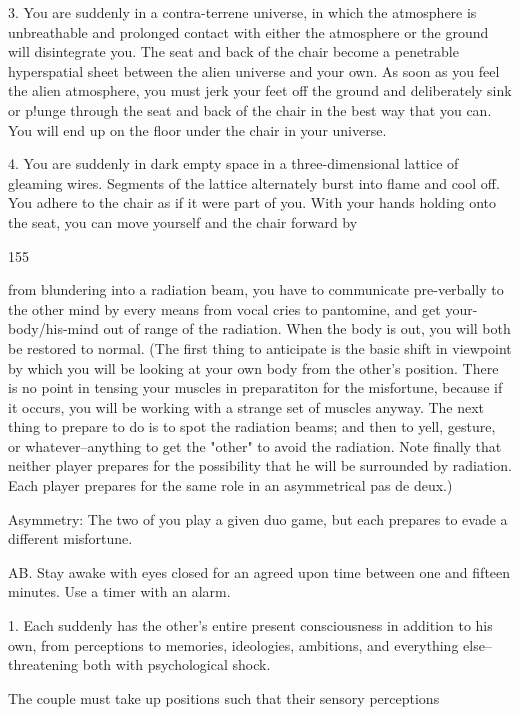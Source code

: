 \documentclass[10pt,twoside]{memoir}
\begin{document}
\begin{enumerate}
{\begin{enumerate}
\begin{sysrules}
\begin{sysrules}
\begin{sysrules}
\begin{sysrules}
3. You are suddenly in a contra-terrene universe, in which the atmosphere is 
unbreathable and prolonged contact with either the atmosphere or the 
ground will disintegrate you. The seat and back of the chair become a 
penetrable hyperspatial sheet between the alien universe and your own. As 
soon as you feel the alien atmosphere, you must jerk your feet off the 
ground and deliberately sink or p!unge through the seat and back of the chair 
in the best way that you can. You will end up on the floor under the chair in 
your universe. 

4. You are suddenly in dark empty space in a three-dimensional lattice of 
gleaming wires. Segments of the lattice alternately burst into flame and cool 
off. You adhere to the chair as if it were part of you. With your hands 
holding onto the seat, you can move yourself and the chair forward by 


155 


from blundering into a radiation beam, you have to communicate 
pre-verbally to the other mind by every means from vocal cries to 
pantomine, and get your-body/his-mind out of range of the radiation. When 
the body is out, you will both be restored to normal. (The first thing to 
anticipate is the basic shift in viewpoint by which you will be looking at 
your own body from the other's position. There is no point in tensing your 
muscles in preparatiton for the misfortune, because if it occurs, you will be 
working with a strange set of muscles anyway. The next thing to prepare to 
do is to spot the radiation beams; and then to yell, gesture, or 
whatever--anything to get the "other" to avoid the radiation. Note finally 
that neither player prepares for the possibility that he will be surrounded by 
radiation. Each player prepares for the same role in an asymmetrical pas de 
deux.) 

Asymmetry: The two of you play a given duo game, but each prepares 
to evade a different misfortune. 

AB. Stay awake with eyes closed for an agreed upon time between one 
and fifteen minutes. Use a timer with an alarm. 

1. Each suddenly has the other's entire present consciousness in addition to 
his own, from perceptions to memories, ideologies, ambitions, and 
everything else--threatening both with psychological shock. 

The couple must take up positions such that their sensory perceptions 


\end{sysrules}
\end{sysrules}
\end{sysrules}
\end{sysrules}
\end{enumerate}}
\end{enumerate}
\end{document}
